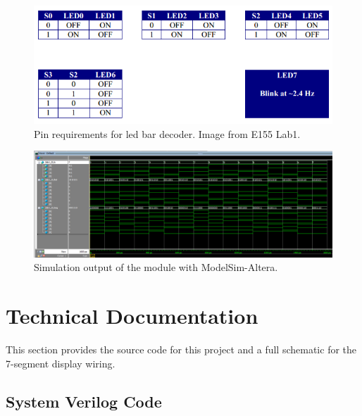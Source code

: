\documentclass[11pt]{article}
\begin{document}
\begin{figure}[h!]
\centering
\includegraphics[scale=0.7]{led_bar.png}
\caption{Pin requirements for led bar decoder. Image from E155 Lab1.}
\label{figure:led_bar_decoder}
\end{figure} 


\begin{figure}[h!]
\centering
\includegraphics[scale=0.54, angle=90]{wave.png}
\caption{Simulation output of the module with ModelSim-Altera.}
\label{figure:wave}
\end{figure} 


\clearpage


\section{Technical Documentation}

This section provides the source code for this project and a full schematic for the 7-segment display wiring.

\subsection{System Verilog Code}
\end{document}
